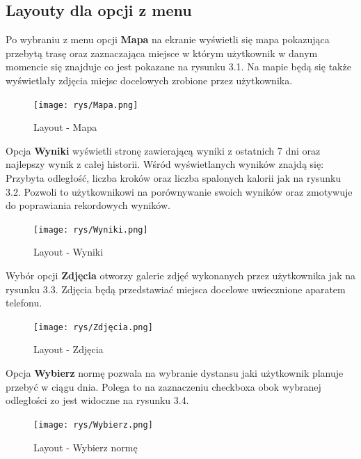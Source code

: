 \subsection{Layouty dla opcji z menu}
\hspace{1cm} Po wybraniu z menu opcji \textbf{Mapa} na ekranie wyświetli się mapa pokazująca przebytą trasę oraz zaznaczająca miejsce w którym użytkownik w danym momencie się znajduje co jest pokazane na rysunku 3.1.
Na mapie będą się także wyświetlały zdjęcia miejsc docelowych zrobione przez użytkownika.
\begin{figure}[!htb]
	\begin{center}
		\texttt{[image: rys/Mapa.png]}
		\caption{Layout - Mapa}
		\label{rys:rysunek003}
	\end{center}
\end{figure}
\newline Opcja \textbf{Wyniki} wyświetli stronę zawierającą wyniki z ostatnich 7 dni oraz najlepszy wynik z całej historii. Wśród wyświetlanych wyników znajdą się: Przybyta odległość, liczba kroków oraz liczba spalonych kalorii jak na rysunku 3.2. Pozwoli to użytkownikowi na porównywanie swoich wyników oraz zmotywuje do poprawiania rekordowych wyników.
\begin{figure}[!htb]
	\begin{center}
		\texttt{[image: rys/Wyniki.png]}
		\caption{Layout - Wyniki}
		\label{rys:rysunek004}
	\end{center}
\end{figure}
\newline Wybór opcji \textbf{Zdjęcia} otworzy galerie zdjęć wykonanych przez użytkownika jak na rysunku 3.3. Zdjęcia będą przedstawiać miejsca docelowe uwiecznione aparatem telefonu.
\begin{figure}[!htb]
	\begin{center}
		\texttt{[image: rys/Zdjęcia.png]}
		\caption{Layout - Zdjęcia}
		\label{rys:rysunek005}
	\end{center}
\end{figure}
\newline
\newline Opcja \textbf{Wybierz} normę pozwala na wybranie dystansu jaki użytkownik planuje przebyć w ciągu dnia. Polega to na zaznaczeniu checkboxa obok wybranej odległości zo jest widoczne na rysunku 3.4.
\begin{figure}[!htb]
	\begin{center}
		\texttt{[image: rys/Wybierz.png]}
		\caption{Layout - Wybierz normę}
		\label{rys:rysunek006}
	\end{center}
\end{figure}
 
